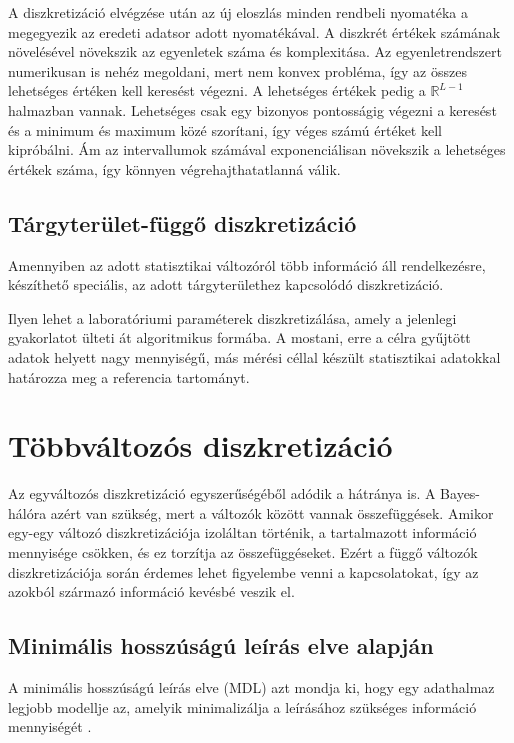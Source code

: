A diszkretizáció elvégzése után az új eloszlás minden rendbeli nyomatéka a megegyezik az eredeti adatsor adott nyomatékával. A diszkrét értékek számának növelésével növekszik az egyenletek száma és komplexitása. Az egyenletrendszert numerikusan is nehéz megoldani, mert nem konvex probléma, így az összes lehetséges értéken kell keresést végezni. A lehetséges értékek pedig a $ \mathbb{R}^{L-1} $ halmazban vannak. Lehetséges csak egy bizonyos pontosságig végezni a keresést és a minimum és maximum közé szorítani, így véges számú értéket kell kipróbálni. Ám az intervallumok számával exponenciálisan növekszik a lehetséges értékek száma, így könnyen végrehajthatatlanná válik.

\subsection{Tárgyterület-függő diszkretizáció}
Amennyiben az adott statisztikai változóról több információ áll rendelkezésre, készíthető speciális, az adott tárgyterülethez kapcsolódó diszkretizáció.

Ilyen lehet a laboratóriumi paraméterek \cite{katayev2010establishing} diszkretizálása, amely a jelenlegi gyakorlatot ülteti át algoritmikus formába. A mostani, erre a célra gyűjtött adatok helyett nagy mennyiségű, más mérési céllal készült statisztikai adatokkal határozza meg a referencia tartományt.

\section{Többváltozós diszkretizáció}
Az egyváltozós diszkretizáció egyszerűségéből adódik a hátránya is. A Bayes-hálóra azért van szükség, mert a változók között vannak összefüggések. Amikor egy-egy változó diszkretizációja izoláltan történik, a tartalmazott információ mennyisége csökken, és ez torzítja az összefüggéseket. Ezért a függő változók diszkretizációja során érdemes lehet figyelembe venni a kapcsolatokat, így az azokból származó információ kevésbé veszik el.

\subsection{Minimális hosszúságú leírás elve alapján}
A minimális hosszúságú leírás elve (MDL) azt mondja ki, hogy egy adathalmaz legjobb modellje az, amelyik minimalizálja a leírásához szükséges információ mennyiségét \cite{friedman1996discretizing}.

